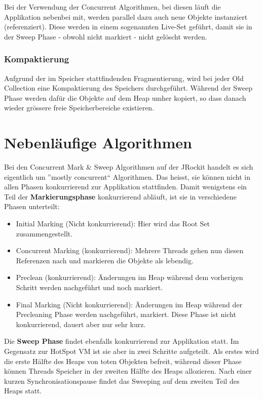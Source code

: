 Bei der Verwendung der Concurrent Algorithmen, bei diesen läuft die Applikation nebenbei mit, werden parallel dazu auch neue Objekte instanziert (referenziert). Diese werden in einem sogenannten Live-Set geführt, damit sie in der Sweep Phase - obwohl nicht markiert - nicht gelöscht werden.

\subsubsection{Kompaktierung}
Aufgrund der im Speicher stattfindenden Fragmentierung, wird bei jeder Old Collection eine Kompaktierung des Speichers durchgeführt. Während der Sweep Phase werden dafür die Objekte auf dem Heap umher kopiert, so dass danach wieder grössere freie Speicherbereiche existieren.

\section{Nebenläufige Algorithmen}
Bei den Concurrent Mark \& Sweep Algorithmen auf der JRockit handelt es sich eigentlich um ''mostly concurrent`` Algorithmen. Das heisst, sie können nicht in allen Phasen konkurrierend zur Applikation stattfinden. Damit wenigstens ein Teil der \textbf{Markierungsphase} konkurrierend abläuft, ist sie in verschiedene Phasen unterteilt:
\begin{itemize}
	\item Initial Marking (Nicht konkurrierend): Hier wird das Root Set zusammengestellt.
	\item Concurrent Marking (konkurrierend): Mehrere Threads gehen nun diesen Referenzen nach und markieren die Objekte als lebendig.
	\item Preclean (konkurrierend): Änderungen im Heap während dem vorherigen Schritt werden nachgeführt und noch markiert.
	\item Final Marking (Nicht konkurrierend): Änderungen im Heap während der Precleaning Phase werden nachgeführt, markiert. Diese Phase ist nicht konkurrierend, dauert aber nur sehr kurz.
\end{itemize}

Die \textbf{Sweep Phase} findet ebenfalls konkurrierend zur Applikation statt. Im Gegensatz zur HotSpot VM ist sie aber in zwei Schritte aufgeteilt. Als erstes wird die erste Hälfte des Heaps von toten Objekten befreit, während dieser Phase können Threads Speicher in der zweiten Hälfte des Heaps allozieren. Nach einer kurzen Synchronisationspause findet das Sweeping auf dem zweiten Teil des Heaps statt.

